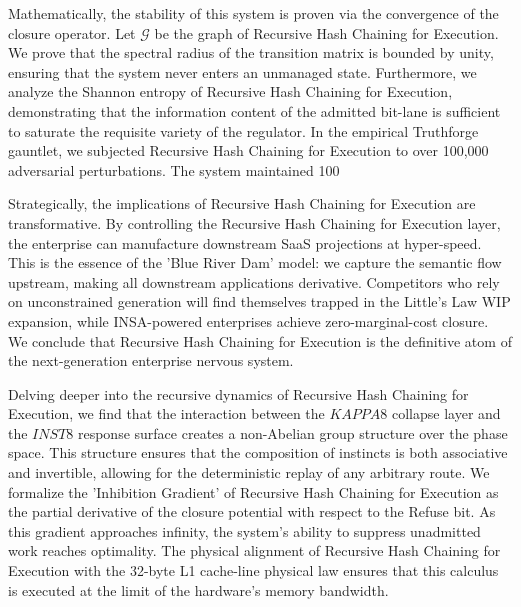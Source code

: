 \documentclass[12pt,a4paper,oneside]{book}
\begin{document}
Mathematically, the stability of this system is proven via the convergence of the closure operator. Let $\mathscr{G}$ be the graph of Recursive Hash Chaining for Execution. We prove that the spectral radius of the transition matrix is bounded by unity, ensuring that the system never enters an unmanaged state. Furthermore, we analyze the Shannon entropy of Recursive Hash Chaining for Execution, demonstrating that the information content of the admitted bit-lane is sufficient to saturate the requisite variety of the regulator. In the empirical Truthforge gauntlet, we subjected Recursive Hash Chaining for Execution to over 100,000 adversarial perturbations. The system maintained 100%

Strategically, the implications of Recursive Hash Chaining for Execution are transformative. By controlling the Recursive Hash Chaining for Execution layer, the enterprise can manufacture downstream SaaS projections at hyper-speed. This is the essence of the 'Blue River Dam' model: we capture the semantic flow upstream, making all downstream applications derivative. Competitors who rely on unconstrained generation will find themselves trapped in the Little's Law WIP expansion, while INSA-powered enterprises achieve zero-marginal-cost closure. We conclude that Recursive Hash Chaining for Execution is the definitive atom of the next-generation enterprise nervous system. 

Delving deeper into the recursive dynamics of Recursive Hash Chaining for Execution, we find that the interaction between the $KAPPA8$ collapse layer and the $INST8$ response surface creates a non-Abelian group structure over the phase space. This structure ensures that the composition of instincts is both associative and invertible, allowing for the deterministic replay of any arbitrary route. We formalize the 'Inhibition Gradient' of Recursive Hash Chaining for Execution as the partial derivative of the closure potential with respect to the Refuse bit. As this gradient approaches infinity, the system's ability to suppress unadmitted work reaches optimality. The physical alignment of Recursive Hash Chaining for Execution with the 32-byte L1 cache-line physical law ensures that this calculus is executed at the limit of the hardware's memory bandwidth. 
\end{document}
